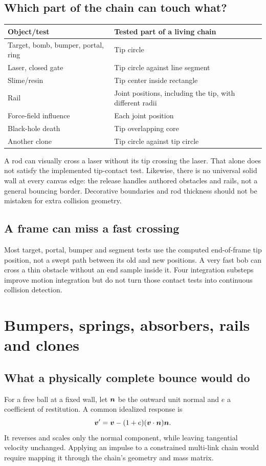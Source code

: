 \documentclass[11pt,a4paper]{article}
\begin{document}
\subsection{Which part of the chain can touch what?}
\begin{center}\begin{tabular}{p{.41\linewidth}p{.49\linewidth}}
\toprule Object/test & Tested part of a living chain\\\midrule
Target, bomb, bumper, portal, ring & Tip circle\\
Laser, closed gate & Tip circle against line segment\\
Slime/resin & Tip center inside rectangle\\
Rail & Joint positions, including the tip, with different radii\\
Force-field influence & Each joint position\\
Black-hole death & Tip overlapping core\\
Another clone & Tip circle against tip circle\\\bottomrule
\end{tabular}\end{center}
A rod can visually cross a laser without its tip crossing the laser. That alone does not satisfy the implemented tip-contact test. Likewise, there is no universal solid wall at every canvas edge: the release handles authored obstacles and rails, not a general bouncing border. Decorative boundaries and rod thickness should not be mistaken for extra collision geometry.

\subsection{A frame can miss a fast crossing}
Most target, portal, bumper and segment tests use the computed end-of-frame tip position, not a swept path between its old and new positions. A very fast bob can cross a thin obstacle without an end sample inside it. Four integration substeps improve motion integration but do not turn those contact tests into continuous collision detection.

\section{Bumpers, springs, absorbers, rails and clones}
\subsection{What a physically complete bounce would do}
For a free ball at a fixed wall, let \(\boldsymbol{n}\) be the outward unit normal and \(e\) a coefficient of restitution. A common idealized response is
\[
 \boldsymbol{v}'=\boldsymbol{v}-(1+e)(\boldsymbol{v}\cdot\boldsymbol{n})\boldsymbol{n}.
\]
It reverses and scales only the normal component, while leaving tangential velocity unchanged. Applying an impulse to a constrained multi-link chain would require mapping it through the chain's geometry and mass matrix.
\end{document}
